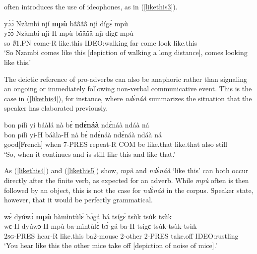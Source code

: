  often introduces the use of ideophones, as in (\ref{likethis3}).

\begin{exe} 
\ex\label{likethis3}
  \glll yɔ́ɔ̀ Nzàmbí njí {\bfseries mpù} bã̂ã̂ã̂ã̂ njì dígɛ̀ mpù \\
        yɔ́ɔ̀ Nzàmbí njî-H mpù bã̂ã̂ã̂ã̂ njì dígɛ mpù \\
        so $\emptyset$1.PN come-R like.this IDEO:walking far come look like.this \\
    \trans `So Nzambi comes like this [depiction of walking a long distance], comes looking like this.'
\end{exe}

\noindent The deictic reference of pro-adverbs can also be anaphoric rather than signaling an ongoing or immediately following non-verbal communicative event. This is the case in (\ref{likethis4}), for instance, where {\itshape ndɛ̀náà} summarizes the situation that the speaker has elaborated previously.


\begin{exe} 
\ex\label{likethis4}
  \glll  bon pílì yí báàlá nà bɛ̀ {\bfseries ndɛ̀náà} ndɛ̀náà ndáà ná \\
        bon pílì yi-H báàla-H nà bɛ̀ ndɛ̀náà ndɛ̀náà ndáà ná \\
          good[French] when 7-PRES repeat-R COM be like.that like.that also still  \\
    \trans `So, when it continues and is still like this and like that.'
\end{exe}

As (\ref{likethis4}) and (\ref{likethis5}) show, {\itshape mpù} and {\itshape ndɛ̀náà} `like this' can both occur directly after the finite verb, as expected for an adverb. While {\itshape mpù} often is then followed by an object, this is not the case for {\itshape ndɛ̀náà} in the corpus. Speaker state, however, that it would be perfectly grammatical.

\begin{exe} 
\ex\label{likethis5}
  \glll wɛ́ dyúwɔ́ {\bfseries mpù} bàmìntùlɛ̀ bɔ́gá bá tsígɛ̀ tsùk tsùk tsùk \\
         wɛ-H dyúwɔ-H mpù ba-mìntùlɛ̀ bɔ́-gá ba-H tsígɛ tsùk-tsùk-tsùk \\
        2\textsc{sg}-PRES hear-R like.this ba2-mouse 2-other 2-PRES take.off IDEO:rustling \\
    \trans `You hear like this the other mice take off [depiction of noise of mice].'
\end{exe}

